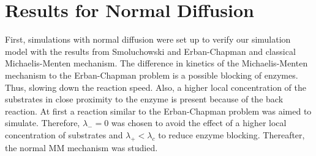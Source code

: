 \documentclass[
  a4paper,BCOR10mm,twoside,
  headsepline,footsepline,%
  fleqn,openbib
]{scrbook}
\begin{document}
\section{Results for Normal Diffusion}
First, simulations with normal diffusion were set up to verify our simulation model  with the results from Smoluchowski \cite{vonSmoluchowski1906} and Erban-Chapman \cite{Erban2009} and classical Michaelis-Menten mechanism. The difference in kinetics of the Michaelis-Menten mechanism to the Erban-Chapman problem is a possible blocking of enzymes. Thus, slowing down the reaction speed. Also, a higher local concentration of the substrates in close proximity to the enzyme  is present because of the back reaction. At first a reaction similar to the Erban-Chapman problem was aimed to simulate. Therefore,  $\lambda_-=0 $  was chosen to avoid the effect of a higher local concentration of substrates and $\lambda_+ < \lambda_c$ to reduce enzyme blocking. Thereafter, the normal MM mechanism was studied. 
\end{document}

